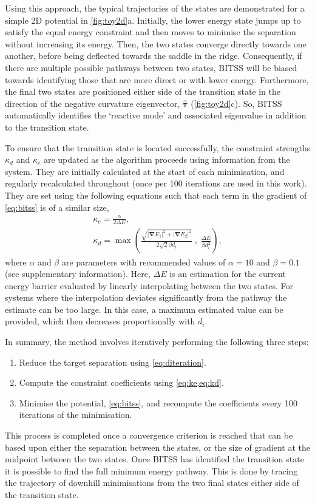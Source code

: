 \documentclass[aps,prl,twocolumn,10pt,groupedaddress]{revtex4-2}
\begin{document}
Using this approach, the typical trajectories of the states are demonstrated for a simple 2D potential in \cref{fig:toy2d}a.
Initially, the lower energy state jumps up to satisfy the equal energy constraint and then moves to minimise the separation without increasing its energy.
Then, the two states converge directly towards one another, before being deflected towards the saddle in the ridge.
Consequently, if there are multiple possible pathways between two states, BITSS will be biased towards identifying those that are more direct or with lower energy.
Furthermore, the final two states are positioned either side of the transition state in the direction of the negative curvature eigenvector, $\bm{\hat{\tau}}$ (\cref{fig:toy2d}c).
So, BITSS automatically identifies the `reactive mode' and associated eigenvalue in addition to the transition state.

To ensure that the transition state is located successfully, the constraint strengths $\kappa_d$ and $\kappa_e$ are updated as the algorithm proceeds using information from the system.
They are initially calculated at the start of each minimisation, and regularly recalculated throughout (once per 100 iterations are used in this work).
They are set using the following equations such that each term in the gradient of \cref{eq:bitss} is of a similar size,
\begin{gather}
  \kappa_e = \frac {\alpha} {2 \Delta E},
  \label{eq:ke}
  \\
  \kappa_d = \max \left(
    \frac {\sqrt{|\bm{\nabla} E_1|^2 + |\bm{\nabla} E_2|^2}} {2\sqrt{2} \beta d_i} \; , \;
    \frac{\Delta E}{\beta d_i^2} \right),
  \label{eq:kd}
\end{gather}
where $\alpha$ and $\beta$ are parameters with recommended values of $\alpha = 10$ and $\beta = 0.1$ (see supplementary information).
Here, $\Delta E$ is an estimation for the current energy barrier evaluated by linearly interpolating between the two states.
For systems where the interpolation deviates significantly from the pathway the estimate can be too large.
In this case, a maximum estimated value can be provided, which then decreases proportionally with $d_i$.

In summary, the method involves iteratively performing the following three steps:
\begin{enumerate}
  \item Reduce the target separation using \cref{eq:diteration}.
  \item Compute the constraint coefficients using \cref{eq:ke,eq:kd}.
  \item Minimise the potential, \cref{eq:bitss}, and recompute the coefficients every 100 iterations of the minimisation.
\end{enumerate}
This process is completed once a convergence criterion is reached that can be based upon either the separation between the states, or the size of gradient at the midpoint between the two states.
Once BITSS has identified the transition state it is possible to find the full minimum energy pathway.
This is done by tracing the trajectory of downhill minimisations from the two final states either side of the transition state.
\end{document}
